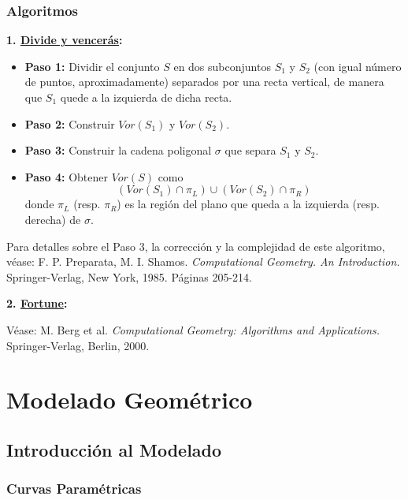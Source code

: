 \documentclass[twoside]{report}
\begin{document}
\subsection{Algoritmos}

\textbf{1. \underline{Divide y vencerás}:}

\begin{itemize}

  \item \textbf{Paso 1:} Dividir el conjunto $S$ en dos subconjuntos $S_1$ y $S_2$ (con igual número de puntos, aproximadamente) se\-pa\-ra\-dos por una recta vertical, de manera que $S_1$ quede a la izquierda de dicha recta.

  \item \textbf{Paso 2:} Construir $Vor(S_1)$ y $Vor(S_2)$.

  \item \textbf{Paso 3:} Construir la cadena poligonal $\sigma$ que separa $S_1$ y $S_2$.

  \item \textbf{Paso 4:} Obtener $Vor(S)$ como $$(Vor(S_1)\cap\pi_L)\cup (Vor(S_2)\cap\pi_R)$$ donde $\pi_L$ (resp. $\pi_R$) es la región del plano que queda a la izquierda (resp. derecha) de $\sigma$.

\end{itemize}

 Para detalles sobre el Paso 3, la corrección y la
complejidad de este algoritmo, véase: {\sc F. P. Preparata, M. I.
Shamos}. {\it Computational Geometry. An Introduction.}
Springer-Verlag, New York, 1985. Páginas 205-214.

\vspace{0.3cm}

\textbf{2. \underline{Fortune}:}

\vspace{0.3cm}

Véase: {\sc M. Berg et al.} {\it Computational
Geometry: Algorithms and Applications.} Springer-Verlag, Berlin,
2000.

\chapter{Modelado Geométrico}


\section{Introducción al Modelado}

\subsection{Curvas Paramétricas}
\end{document}
